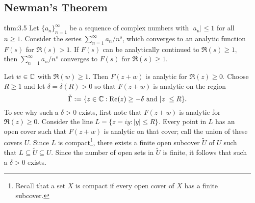 \subsection{Newman's Theorem}\label{subsec:3.2}

\vspace{2ex}
\begin{theo}[Newman]{thm:3.5}
Let $\{a_n\}_{n=1}^\infty$ be a sequence of complex numbers with $|a_n| \leq 1$ for all $n \geq 1$. 
Consider the series $\sum_{n=1}^\infty a_n/n^s$, which converges to an analytic function 
$F(s)$ for $\Re(s) > 1$. If $F(s)$ can be analytically continued to $\Re(s) \geq 1$, then 
$\sum_{n=1}^\infty a_n/n^s$ converges to $F(s)$ for $\Re(s) \geq 1$. 
\end{theo}
\begin{pf}
Let $w \in \mathbb{C}$ with $\Re(w) \geq 1$. Then $F(z+w)$ is analytic for $\Re(z) \geq 0$. Choose 
$R \geq 1$ and let $\delta = \delta(R) > 0$ so that $F(z+w)$ is analytic on the region 
\[ \tilde\Gamma := \{z \in \mathbb{C} : {\rm Re}(z) \geq -\delta \text{ and } |z| \leq R\}. \]
To see why such a $\delta > 0$ exists, first note that $F(z+w)$ is analytic for $\Re(z) \geq 0$. 
Consider the line $L = \{z = iy : |y| \leq R\}$. Every point in $L$ has an open cover such that 
$F(z+w)$ is analytic on that cover; call the union of these covers $U$. Since $L$ is compact\footnote{Recall that a set $X$ is compact if every open cover of $X$ has a finite subcover.}, there exists a finite open subcover $\tilde U$ of $U$ such that 
$L \subseteq \tilde U \subseteq U$. Since the number of open sets in $\tilde U$ is finite, 
it follows that such a $\delta > 0$ exists.


\end{pf}
